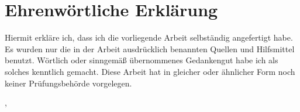 
\chapter*{Ehrenwörtliche Erklärung}

Hiermit erkläre ich, dass ich die vorliegende Arbeit selbständig angefertigt habe.
Es wurden nur die in der Arbeit ausdrücklich benannten Quellen und Hilfsmittel benutzt.
Wörtlich oder sinngemäß übernommenes Gedankengut habe ich als solches kenntlich gemacht.
Diese Arbeit hat in gleicher oder ähnlicher Form noch keiner Prüfungsbehörde vorgelegen.
\vspace{20mm}

\ort, \abgabedatum
\vspace{10mm}

\underline{\hspace{8cm}}\\\dokumentenautor